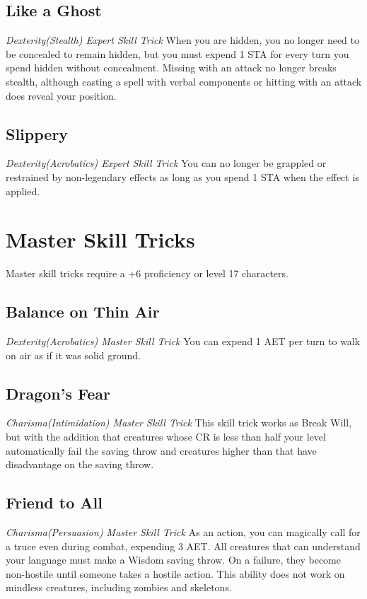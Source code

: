 \subsection{Like a Ghost}
\textit{Dexterity(Stealth) Expert Skill Trick}
When you are hidden, you no longer need to be concealed to remain hidden, but you must expend 1 STA for every turn you spend hidden without concealment. Missing with an attack no longer breaks stealth, although casting a spell with verbal components or hitting with an attack does reveal your position.

\subsection{Slippery}
\textit{Dexterity(Acrobatics) Expert Skill Trick}
You can no longer be grappled or restrained by non-legendary effects as long as you spend 1 STA when the effect is applied.

\section{Master Skill Tricks}
\label{sec:skill-tricks-master}

Master skill tricks require a +6 proficiency or level 17 characters.
\subsection{Balance on Thin Air}
\textit{Dexterity(Acrobatics) Master Skill Trick}
You can expend 1 AET per turn to walk on air as if it was solid ground.

\subsection{Dragon's Fear}
\textit{Charisma(Intimidation) Master Skill Trick}
This skill trick works as Break Will, but with the addition that creatures whose CR is less than half your level automatically fail the saving throw and creatures higher than that have disadvantage on the saving throw.

\subsection{Friend to All}
\textit{Charisma(Persuasion) Master Skill Trick}
As an action, you can magically call for a truce even during combat, expending 3 AET. All creatures that can understand your language must make a Wisdom saving throw. On a failure, they become non-hostile until someone takes a hostile action. This ability does not work on mindless creatures, including zombies and skeletons.


